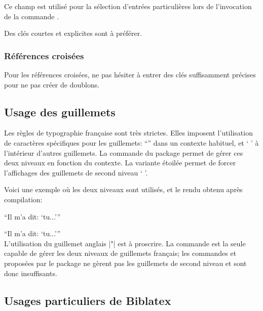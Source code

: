 \documentclass{ltxdockit}
\newcommand*{\biblatex}{Biblatex\xspace}
\begin{document}
Ce champ est utilisé pour la sélection d'entrées particulières lors de l'invocation de la commande .

Des clés courtes et explicites sont à préférer.

\subsubsection{Références croisées}

Pour les références croisées, ne pas hésiter à entrer des clés suffisamment précises pour ne pas créer de doublons. 

\subsection{Usage des guillemets}

\begin{ltxsyntax}

\label{guillemets}

Les règles de typographie française sont très strictes. Elles imposent l'utilisation de caractères spécifiques pour les guillemets: \enquote{} dans un contexte habituel, et \enquote*{ } à l'intérieur d'autres guillemets. La commande  du package  permet de gérer ces deux niveaux en fonction du contexte. La variante étoilée permet de forcer l'affichages des guillemets de second niveau \enquote*{ }.

Voici une exemple où les deux niveaux sont utilisés, et le rendu obtenu après compilation:
\begin{ltxexample}
\enquote{Il m'a dit: \enquote{tu...}}
\end{ltxexample}
\enquote{Il m'a dit: \enquote{tu...}}\\

L'utilisation du guillemet anglais |"| est à proscrire. La commande  est la seule capable de gérer les deux niveaux de guillemets français; les commandes  et  proposées par le package  ne gèrent pas les guillemets de second niveau et sont donc insuffisants.

\end{ltxsyntax}

\subsection{Usages particuliers de \biblatex}
\end{document}
